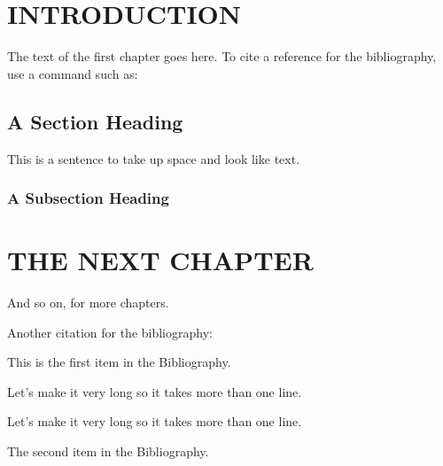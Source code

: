 \documentclass{thesis}
\begin{document}

\chapter{INTRODUCTION}
The text of the first chapter goes here. To cite a reference for the
bibliography, use a command such as: %

\section{A Section Heading}

This is a sentence to take up space and look like text.

\subsection{A Subsection Heading}

\chapter{THE NEXT CHAPTER}

And so on, for more chapters.

Another citation for the bibliography:\cite{anotherbook}





\begin{singlespace}

\begin{thebibliography}{99}

 This is the first item in the Bibliography.

Let's make it very long so it takes more than one line.

Let's make it very long so it takes more than one line.

 The second item in the Bibliography.

\end{thebibliography}

\end{singlespace}
\end{document}
